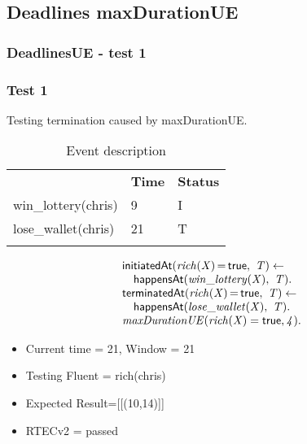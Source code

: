 \documentclass[8pt]{beamer}
\DeclareMathOperator{\val}{=}  %
\def \patsize {}
\def\happensAt{\textsf{\patsize happensAt}}
\def\initiatedAt{\textsf{\patsize initiatedAt}}
\def\terminatedAt{\textsf{\patsize terminatedAt}}
\def\true{\textsf{\patsize true}}
\newenvironment{mysplit}%
  {\arraycolsep 0pt \begin{array}{l}}%
  {\end{array}}
\begin{document}
\subsection{Deadlines maxDurationUE}
\begin{frame}
    \frametitle{DeadlinesUE - test 1}
    \subsubsection{Test 1}
    \small
    Testing termination caused by maxDurationUE.\linebreak
    \begin{minipage}{0.48\linewidth}
        \begin{table}[t!]
            \caption{Event description}
            \begin{center}

                \begin{tabular}{lll}
                    \hline\noalign{\smallskip}
                    \multicolumn{1}{l}{\textbf{Event}} & \multicolumn{1}{c}{\textbf{Time}} & \multicolumn{1}{c}{\textbf{Status}} \\
                    win\_lottery(chris)& 9 & I\\
                    lose\_wallet(chris)& 21 & T\\
                    \noalign{\smallskip}
                    \hline
                \end{tabular}
            \end{center}
        \end{table}
    \end{minipage}
    \begin{minipage}{0.48\linewidth}
        \begin{align*}
            \begin{mysplit}
                \initiatedAt\mathit{(rich(X)\val\true,\ T) \leftarrow}\\
                \quad    \happensAt\mathit{(win\_lottery(X),\ T).}\\
                \terminatedAt\mathit{(rich(X)\val\true,\ T) \leftarrow}\\
                \quad    \happensAt\mathit{(lose\_wallet(X),\ T)}.\\
                \mathit{maxDurationUE(rich(X)=\true,4)}.\\
            \end{mysplit}
        \end{align*}
    \end{minipage}
    \begin{itemize}
        \item Current time = 21, Window = 21
        \item Testing Fluent = rich(chris)
        \item Expected Result=[[(10,14)]]
        \item RTECv2 = passed
    \end{itemize}
\end{frame}
\end{document}
